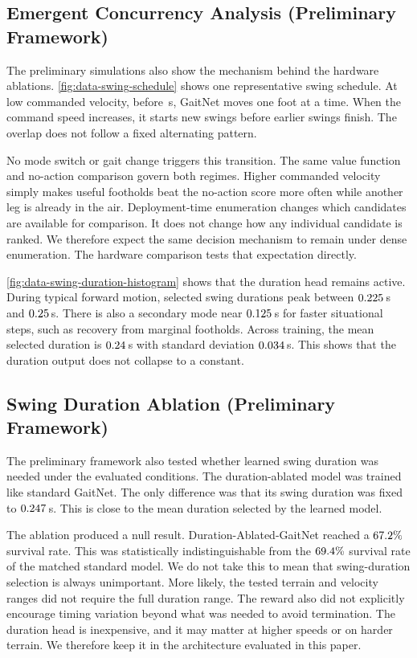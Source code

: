 \subsection{Emergent Concurrency Analysis (Preliminary Framework)}
\label{subsec:results-concurrency}

The preliminary simulations also show the mechanism behind the
hardware ablations. \autoref{fig:data-swing-schedule} shows one
representative swing schedule. At low commanded velocity, before
\corlSwingScheduleTransitionMark\,s, GaitNet moves one foot at a time.
When the command speed increases, it starts new swings before earlier
swings finish. The overlap does not follow a fixed alternating
pattern.

No mode switch or gait change triggers this transition. The same value
function and no-action comparison govern both regimes. Higher
commanded velocity simply makes useful footholds beat the no-action
score more often while another leg is already in the air.
Deployment-time enumeration changes which candidates are
available for comparison. It does not change how any individual
candidate is ranked. We therefore expect the same decision mechanism
to remain under dense enumeration. The hardware comparison tests that
expectation directly.

\autoref{fig:data-swing-duration-histogram} shows that the duration
head remains active. During typical forward motion, selected swing
durations peak between $0.225$\,s and
$0.25$\,s. There is also a secondary mode near
$0.125$\,s for faster situational steps, such as
recovery from marginal footholds. Across training, the mean selected
duration is $0.24$\,s with standard deviation
$0.034$\,s. This shows that the duration output
does not collapse to a constant.

\subsection{Swing Duration Ablation (Preliminary Framework)}
\label{subsec:results-duration-ablation}

The preliminary framework \cite{Sullivan2025} also tested whether
learned swing duration was needed under the evaluated conditions. The
duration-ablated model was trained like standard GaitNet. The only
difference was that its swing duration was fixed to
$0.247$\,s. This is close to the mean
duration selected by the learned model.

The ablation produced a null result. Duration-Ablated-GaitNet reached
a $67.2\%$ survival rate. This was
statistically indistinguishable from the
$69.4\%$ survival rate of the matched standard
model. We do not take this to mean that swing-duration selection is
always unimportant. More likely, the tested terrain and velocity
ranges did not require the full duration range. The reward also did
not explicitly encourage timing variation beyond what was needed to
avoid termination. The duration head is inexpensive, and it may matter
at higher speeds or on harder terrain. We therefore keep it in the
architecture evaluated in this paper.
